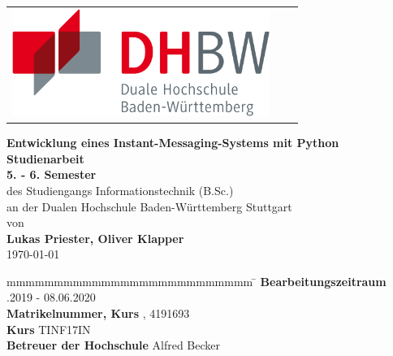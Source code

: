 \documentclass[a4paper,titlepage,halfparskip,12pt]{scrreprt}
\newcommand{\titel}{Entwicklung eines Instant-Messaging-Systems mit Python}
\begin{document}
\begin{table}[h]
\centering
\begin{tabular}{lcr}
\includegraphics[height=3.5cm]{images/dhbw-logo}
\end{tabular}
\end{table}
\bigskip
\bigskip
\begin{center}
\vspace*{12mm} {\LARGE\textbf{\titel}}\\
\vspace*{12mm} {\large\textbf{Studienarbeit}}\\
\vspace*{3mm} {\large\textbf{5. - 6. Semester}}\\
\vspace*{12mm} des Studiengangs Informationstechnik (B.Sc.)\\ an der Dualen Hochschule Baden-Württemberg Stuttgart\\
\vspace*{12mm} von\\
\vspace*{3mm} {\large\textbf{Lukas Priester, Oliver Klapper}}\\
\vspace*{12mm} \today\\
\end{center}
\vfill
\begin{spacing}{1.5}
\begin{tabbing}
mmmmmmmmmmmmmmmmmmmmmmmmmm \= \kill
\textbf{Bearbeitungszeitraum} .2019 - 08.06.2020\\
\textbf{Matrikelnummer, Kurs} , 4191693 \\
\textbf{Kurs} \> TINF17IN\\
\textbf{Betreuer der Hochschule} \> Alfred Becker\\
\end{tabbing}
\end{spacing}
\newpage
\end{document}
